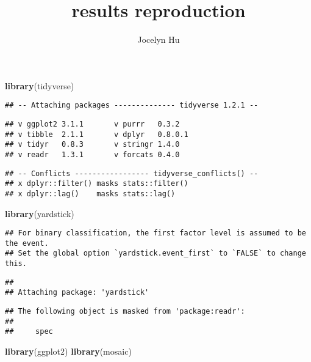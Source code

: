 \documentclass[]{article}
\title{results reproduction}
\author{Jocelyn Hu}
\date{}
\newenvironment{Shaded}{\begin{snugshade}}{\end{snugshade}}
\newcommand{\KeywordTok}[1]{\textcolor[rgb]{0.13,0.29,0.53}{\textbf{#1}}}
\newcommand{\NormalTok}[1]{#1}
\begin{document}
\maketitle

\begin{Shaded}
\begin{Highlighting}[]
\KeywordTok{library}\NormalTok{(tidyverse)}
\end{Highlighting}
\end{Shaded}

\begin{verbatim}
## -- Attaching packages -------------- tidyverse 1.2.1 --
\end{verbatim}

\begin{verbatim}
## v ggplot2 3.1.1       v purrr   0.3.2  
## v tibble  2.1.1       v dplyr   0.8.0.1
## v tidyr   0.8.3       v stringr 1.4.0  
## v readr   1.3.1       v forcats 0.4.0
\end{verbatim}

\begin{verbatim}
## -- Conflicts ----------------- tidyverse_conflicts() --
## x dplyr::filter() masks stats::filter()
## x dplyr::lag()    masks stats::lag()
\end{verbatim}

\begin{Shaded}
\begin{Highlighting}[]
\KeywordTok{library}\NormalTok{(yardstick)}
\end{Highlighting}
\end{Shaded}

\begin{verbatim}
## For binary classification, the first factor level is assumed to be the event.
## Set the global option `yardstick.event_first` to `FALSE` to change this.
\end{verbatim}

\begin{verbatim}
## 
## Attaching package: 'yardstick'
\end{verbatim}

\begin{verbatim}
## The following object is masked from 'package:readr':
## 
##     spec
\end{verbatim}

\begin{Shaded}
\begin{Highlighting}[]
\KeywordTok{library}\NormalTok{(ggplot2)}
\KeywordTok{library}\NormalTok{(mosaic)}
\end{Highlighting}
\end{Shaded}
\end{document}
